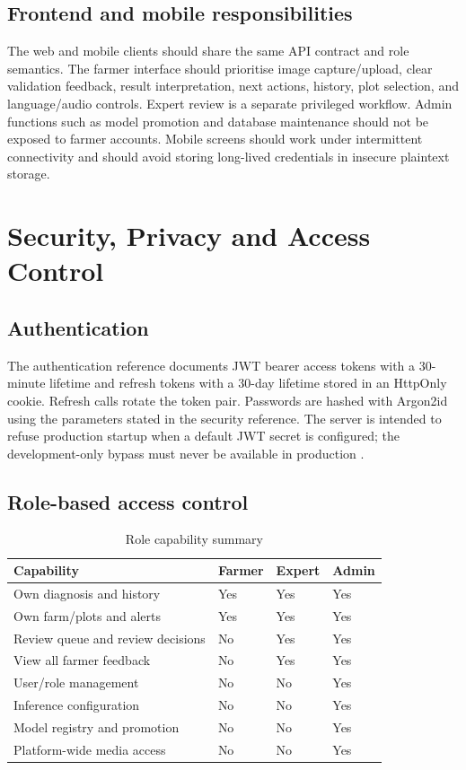 \documentclass[12pt,a4paper,oneside,openany]{report}
\begin{document}
\section{Frontend and mobile responsibilities}
The web and mobile clients should share the same API contract and role semantics. The farmer interface should prioritise image capture/upload, clear validation feedback, result interpretation, next actions, history, plot selection, and language/audio controls. Expert review is a separate privileged workflow. Admin functions such as model promotion and database maintenance should not be exposed to farmer accounts. Mobile screens should work under intermittent connectivity and should avoid storing long-lived credentials in insecure plaintext storage.

\chapter{Security, Privacy and Access Control}
\section{Authentication}
The authentication reference documents JWT bearer access tokens with a 30-minute lifetime and refresh tokens with a 30-day lifetime stored in an HttpOnly cookie. Refresh calls rotate the token pair. Passwords are hashed with Argon2id using the parameters stated in the security reference. The server is intended to refuse production startup when a default JWT secret is configured; the development-only bypass must never be available in production \cite{auth_reference}.

\section{Role-based access control}
\begin{table}[H]
\centering
\caption{Role capability summary}\label{tab:role-capabilities}
\begin{tabularx}{\textwidth}{P{2.2cm}XXX}
\toprule
\textbf{Capability} & \textbf{Farmer} & \textbf{Expert} & \textbf{Admin}\\
\midrule
Own diagnosis and history & Yes & Yes & Yes\\
Own farm/plots and alerts & Yes & Yes & Yes\\
Review queue and review decisions & No & Yes & Yes\\
View all farmer feedback & No & Yes & Yes\\
User/role management & No & No & Yes\\
Inference configuration & No & No & Yes\\
Model registry and promotion & No & No & Yes\\
Platform-wide media access & No & No & Yes\\
\bottomrule
\end{tabularx}
\end{table}
\end{document}
